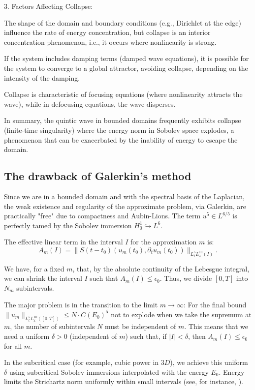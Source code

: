 \documentclass[11pt,letterpaper]{amsart}
\begin{document}
3. Factors Affecting Collapse:

The shape of the domain and boundary conditions (e.g., Dirichlet at the edge) influence the rate of energy concentration, but collapse is an interior concentration phenomenon, i.e., it occurs where nonlinearity is strong.

If the system includes damping terms (damped wave equations), it is possible for the system to converge to a global attractor, avoiding collapse, depending on the intensity of the damping.

Collapse is characteristic of focusing equations (where nonlinearity attracts the wave), while in defocusing equations, the wave disperses.

In summary, the quintic wave in bounded domains frequently exhibits collapse (finite-time singularity) where the energy norm in Sobolev space explodes, a phenomenon that can be exacerbated by the inability of energy to escape the domain.

\subsection{The drawback of Galerkin's method}

Since we are in a bounded domain and with the spectral basis of the Laplacian, the weak existence and regularity of the approximate problem, via Galerkin, are practically "free" due to compactness and Aubin-Lions. The term $u^5 \in L^{6/5}$ is perfectly tamed by the Sobolev immersion $H_0^1 \hookrightarrow L^6$.

The effective linear term in the interval $I$ for the approximation $m$ is: $$A_m(I) = \|S(t-t_0)(u_m(t_0),\partial_t u_m(t_0))\|_{L^5_t L^{10}_x(I)}.$$

We have, for a fixed $m$, that, by the absolute continuity of the Lebesgue integral, we can shrink the interval $I$ such that $A_m(I) \le \epsilon_0$. Thus, we divide $[0,T]$ into $N_m$ subintervals.

The major problem is in the transition to the limit $m \rightarrow \infty$: For the final bound $\|u_m\|_{L^5_t L^{10}_x([0,T])} \le N \cdot C(E_0)^5$ not to explode when we take the supremum at $m$, the number of subintervals $N$ must be independent of $m$. This means that we need a uniform $\delta > 0$ (independent of $m$) such that, if $|I| < \delta$, then $A_m(I) \le \epsilon_0$ for all $m$.

In the subcritical case (for example, cubic power in $3D$), we achieve this uniform $\delta$ using subcritical Sobolev immersions interpolated with the energy $E_0$. Energy limits the Strichartz norm uniformly within small intervals (see, for instance, \cite{Cavalcanti2018}).
\end{document}
